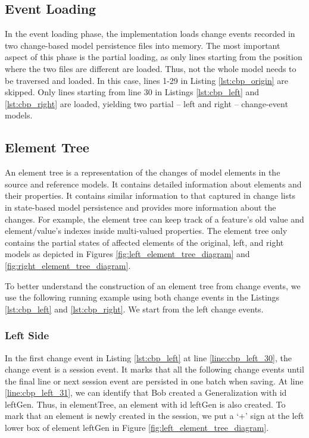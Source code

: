 \subsection{Event Loading}
\label{sec:event_loading}
In the event loading phase, the implementation loads change events recorded in two change-based model persistence files into memory.
The most important aspect of this phase is the partial loading, as only lines starting from the position where the two files are different are loaded.
Thus, not the whole model needs to be traversed and loaded.
In this case, lines 1-29 in Listing \ref{lst:cbp_origin} are skipped. Only lines starting from line 30 in Listings \ref{lst:cbp_left} and \ref{lst:cbp_right} are loaded, yielding two partial -- left and right -- change-event models. 

\subsection{Element Tree}
\label{sec:tree_construction}
An element tree is a representation of the changes of model elements in the source and reference models. It contains detailed information about elements and their properties. It contains similar information to that captured in change lists in state-based model persistence and provides more information about the changes. For example, the element tree can keep track of a feature's old value and element/value's indexes inside multi-valued properties. The element tree only contains the partial states of affected elements of the original, left, and right models as depicted in Figures \ref{fig:left_element_tree_diagram} and \ref{fig:right_element_tree_diagram}.

To better understand the construction of an element tree from change events, we use the following running example using both change events in the Listings \ref{lst:cbp_left} and \ref{lst:cbp_right}. We start from the left change events. 

\subsubsection{Left Side}\label{sec:left_side}
In the first change event in Listing \ref{lst:cbp_left} at line \ref{line:cbp_left_30}, the change event is a \textsf{session} event. It marks that all the following change events until the final line or next \textsf{session} event are persisted in one batch when saving. At line \ref{line:cbp_left_31}, we can identify that Bob created a \textsf{Generalization} with id \textsf{leftGen}. Thus, in \textsf{elementTree}, an element with id \textsf{leftGen} is also created. To mark that an element is newly created in the session, we put a `+' sign at the left lower box of element \textsf{leftGen} in Figure \ref{fig:left_element_tree_diagram}.


